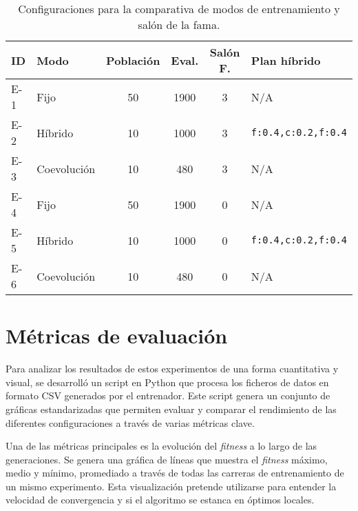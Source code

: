 \begin{table}[H]
	\centering
	\caption{Configuraciones para la comparativa de modos de entrenamiento y salón de la fama.}
	\label{tab:main_experiments}
	\begin{tabular}{@{}llcccl@{}}
		\toprule
		\textbf{ID} & \textbf{Modo} & \textbf{Población} & \textbf{Eval.} & \textbf{Salón F.} & \textbf{Plan híbrido} \\ \midrule
		E-1         & Fijo                        & 50                 & 1900                  & 3                         & N/A                            \\
		E-2         & Híbrido                     & 10                 & 1000                  & 3                         & \texttt{f:0.4,c:0.2,f:0.4}     \\
		E-3         & Coevolución                 & 10                 & 480                   & 3                         & N/A                            \\
		\midrule
		E-4         & Fijo                        & 50                 & 1900                  & 0                         & N/A                            \\
		E-5         & Híbrido                     & 10                 & 1000                  & 0                         & \texttt{f:0.4,c:0.2,f:0.4}     \\
		E-6         & Coevolución                 & 10                 & 480                   & 0                         & N/A                            \\ \bottomrule
	\end{tabular}
\end{table}

\section{Métricas de evaluación} \label{sec:metricas_evaluacion}

Para analizar los resultados de estos experimentos de una forma cuantitativa y visual, se desarrolló un script en Python que procesa los ficheros de datos en formato CSV generados por el entrenador. Este script genera un conjunto de gráficas estandarizadas que permiten evaluar y comparar el rendimiento de las diferentes configuraciones a través de varias métricas clave.

Una de las métricas principales es la evolución del \textit{fitness} a lo largo de las generaciones. Se genera una gráfica de líneas que muestra el \textit{fitness} máximo, medio y mínimo, promediado a través de todas las carreras de entrenamiento de un mismo experimento. Esta visualización pretende utilizarse para entender la velocidad de convergencia y si el algoritmo se estanca en óptimos locales.

